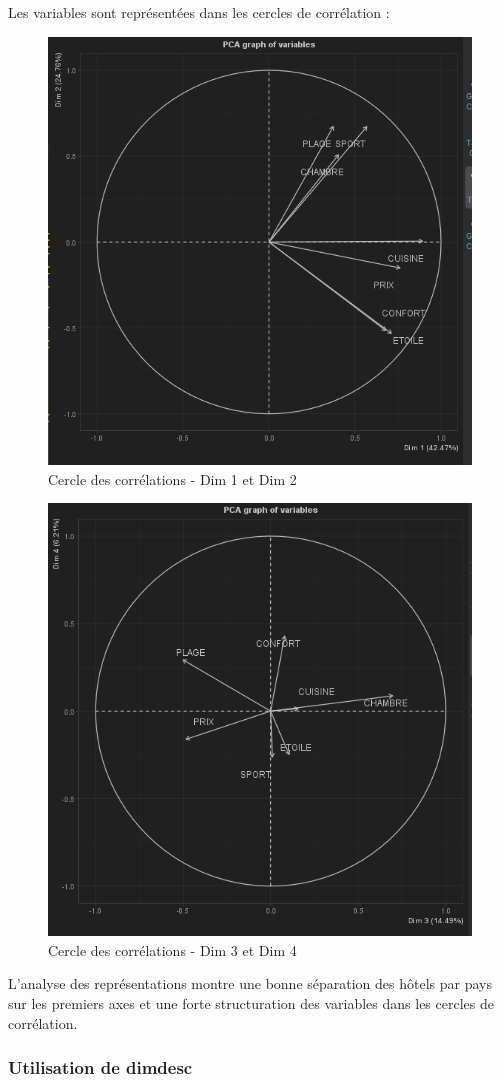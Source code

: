 \documentclass{article}
\begin{document}
    Les variables sont représentées dans les cercles de corrélation :

    \begin{figure}[H]
        \centering
        \includegraphics[width=0.6\linewidth]{img/PCA4}
        \caption{Cercle des corrélations - Dim 1 et Dim 2}
    \end{figure}

    \begin{figure}[H]
        \centering
        \includegraphics[width=0.6\linewidth]{img/PCA3}
        \caption{Cercle des corrélations - Dim 3 et Dim 4}
    \end{figure}

    L’analyse des représentations montre une bonne séparation des hôtels par pays sur les premiers axes et une forte structuration des variables dans les cercles de corrélation.

    \subsubsection{Utilisation de dimdesc}
\end{document}

